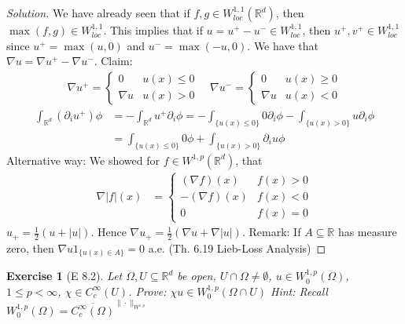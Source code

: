\documentclass{report}
\theoremstyle{tommy}
\newtheorem{ex}[defn]{Exercise}
\begin{document}
  \begin{proof}[Solution]
    We have already seen that if \(f, g \in W_{loc}^{1,1}(\mathbb{R}^d)\), then \(\max(f,g) \in W_{loc}^{1,1}\). This implies that if \(u = u^+ - u^- \in W^{1,1}_{loc}\), then \(u^+, v^+ \in W_{loc}^{1,1}\) since \(u^+ = \max(u, 0)\) and \(u^- = \max(-u, 0)\). We have that \(\nabla u = \nabla u^+ - \nabla u^-\). Claim:
    \begin{align*}
      \nabla u^+ = \begin{cases}
        0 & u(x) \le 0 \\ \nabla u & u(x) > 0
      \end{cases} \quad 
      \nabla u^- = \begin{cases}
        0 & u(x) \ge 0 \\ \nabla u & u(x) < 0
      \end{cases}
    \end{align*}    
    \begin{align*}
      \int_{\mathbb{R}^d} (\partial_i u^+) \phi 
      &= - \int_{\mathbb{R}^d} u^+ \partial_i \phi 
      = -\int_{\{u(x) \le 0\}} 0 \partial_i \phi - \int_{\{u(x) > 0\}} u \partial_i \phi \\
      &= \int_{\{u(x) \le 0\}}0 \phi + \int_{\{u(x) > 0\}} \partial_i u \phi
    \end{align*}
    Alternative way: We showed for \(f \in W^{1,p}(\mathbb{R}^d)\), that 
    \begin{align*}
      \nabla |f|(x) &= \begin{cases}
        (\nabla f)(x) &f(x) > 0 \\ - (\nabla f)(x) & f(x) < 0 \\ 0 & f(x) = 0
      \end{cases}
    \end{align*}
    \(u_+ = \frac{1}{2}(u + |u|)\). Hence \(\nabla u_+ = \frac{1}{2}(\nabla u + \nabla |u|)\).
    Remark: If \(A \subseteq \mathbb{R}\) has measure zero, then \(\nabla u 1 _{\{u(x) \in A\}} = 0\) a.e. (Th. 6.19 Lieb-Loss Analysis)
  \end{proof}

  \begin{ex}[E 8.2]
    Let \(\Omega, U \subseteq \mathbb{R}^d\) be open, \(U \cap \Omega \ne \emptyset\), \(u \in W_0^{1,p}(\Omega)\), \(1 \le p < \infty\), \(\chi \in C_c^\infty(U)\). Prove: \(\chi u \in W_0^{1,p}(\Omega \cap U)\)
    Hint: Recall \(W_0^{1,p}(\Omega) = \overline{C_c^\infty(\Omega)}^{\|\cdot\|_{W^{1,p}}}\)
  \end{ex}
\end{document}
